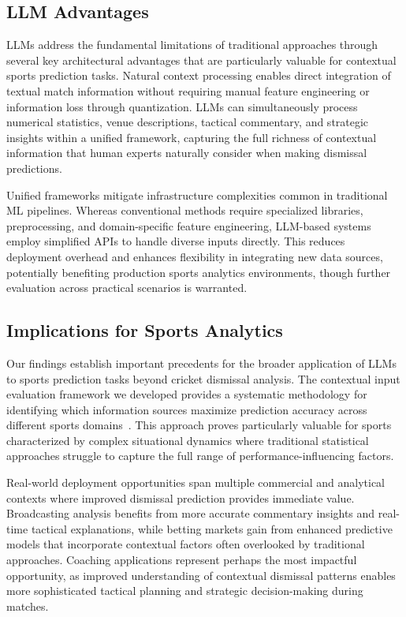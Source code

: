 \documentclass[sigconf,anonymous,review]{acmart}
\begin{document}
\subsection{LLM Advantages}

LLMs address the fundamental limitations of traditional approaches through several key architectural advantages that are particularly valuable for contextual sports prediction tasks. Natural context processing enables direct integration of textual match information without requiring manual feature engineering or information loss through quantization. LLMs can simultaneously process numerical statistics, venue descriptions, tactical commentary, and strategic insights within a unified framework, capturing the full richness of contextual information that human experts naturally consider when making dismissal predictions.

Unified frameworks mitigate infrastructure complexities common in traditional ML pipelines. Whereas conventional methods require specialized libraries, preprocessing, and domain-specific feature engineering, LLM-based systems employ simplified APIs to handle diverse inputs directly. This reduces deployment overhead and enhances flexibility in integrating new data sources, potentially benefiting production sports analytics environments, though further evaluation across practical scenarios is warranted.


\subsection{Implications for Sports Analytics}

Our findings establish important precedents for the broader application of LLMs to sports prediction tasks beyond cricket dismissal analysis. The contextual input evaluation framework we developed provides a systematic methodology for identifying which information sources maximize prediction accuracy across different sports domains~\cite{contextual_sports_modeling}. This approach proves particularly valuable for sports characterized by complex situational dynamics where traditional statistical approaches struggle to capture the full range of performance-influencing factors.

Real-world deployment opportunities span multiple commercial and analytical contexts where improved dismissal prediction provides immediate value. Broadcasting analysis benefits from more accurate commentary insights and real-time tactical explanations, while betting markets gain from enhanced predictive models that incorporate contextual factors often overlooked by traditional approaches. Coaching applications represent perhaps the most impactful opportunity, as improved understanding of contextual dismissal patterns enables more sophisticated tactical planning and strategic decision-making during matches.
\end{document}
